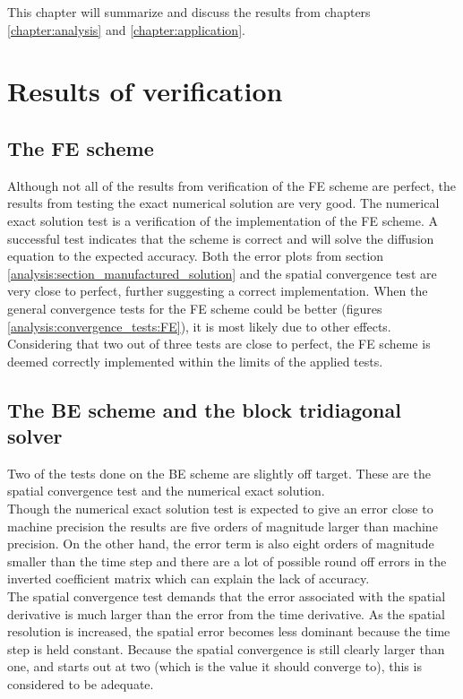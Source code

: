 \noindent This chapter will summarize and discuss the results from chapters \ref{chapter:analysis} and \ref{chapter:application}.

\section{Results of verification}


\subsection{The FE scheme}
Although not all of the results from verification of the FE scheme are perfect, the results from testing the exact numerical solution are very good. 
The numerical exact solution test is a verification of the implementation of the FE scheme. 
A successful test indicates that the scheme is correct and will solve the diffusion equation to the expected accuracy. 
Both the error plots from section \ref{analysis:section_manufactured_solution} and the spatial convergence test are very close to perfect, further suggesting a correct implementation. 
When the general convergence tests for the FE scheme could be better (figures \ref{analysis:convergence_tests:FE}), it is most likely due to other effects. \\
Considering that two out of three tests are close to perfect, the FE scheme is deemed correctly implemented within the limits of the applied tests.

\subsection{The BE scheme and the block tridiagonal solver}
Two of the tests done on the BE scheme are slightly off target. 
These are the spatial convergence test and the numerical exact solution. \\
Though the numerical exact solution test is expected to give an error close to machine precision the results are five orders of magnitude larger than machine precision. 
On the other hand, the error term is also eight orders of magnitude smaller than the time step and there are a lot of possible round off errors in the inverted coefficient matrix which can explain the lack of accuracy. \\
The spatial convergence test demands that the error associated with the spatial derivative is much larger than the error from the time derivative. 
As the spatial resolution is increased, the spatial error becomes less dominant because the time step is held constant. 
Because the spatial convergence is still clearly larger than one, and starts out at two (which is the value it should converge to), this is considered to be adequate. \\

